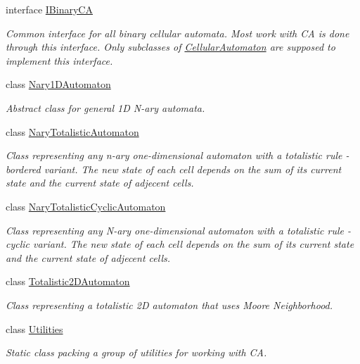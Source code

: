 \begin{DoxyCompactItemize}
interface \hyperlink{interface_cellular_1_1_i_binary_c_a}{I\+Binary\+C\+A}
\begin{DoxyCompactList}\small\item\em Common interface for all binary cellular automata. Most work with C\+A is done through this interface. Only subclasses of {\ttfamily \hyperlink{class_cellular_1_1_cellular_automaton}{Cellular\+Automaton}} are supposed to implement this interface. \end{DoxyCompactList}\item 
class \hyperlink{class_cellular_1_1_nary1_d_automaton}{Nary1\+D\+Automaton}
\begin{DoxyCompactList}\small\item\em Abstract class for general 1\+D N-\/ary automata. \end{DoxyCompactList}\item 
class \hyperlink{class_cellular_1_1_nary_totalistic_automaton}{Nary\+Totalistic\+Automaton}
\begin{DoxyCompactList}\small\item\em Class representing any n-\/ary one-\/dimensional automaton with a totalistic rule -\/ bordered variant. The new state of each cell depends on the sum of its current state and the current state of adjecent cells. \end{DoxyCompactList}\item 
class \hyperlink{class_cellular_1_1_nary_totalistic_cyclic_automaton}{Nary\+Totalistic\+Cyclic\+Automaton}
\begin{DoxyCompactList}\small\item\em Class representing any N-\/ary one-\/dimensional automaton with a totalistic rule -\/ cyclic variant. The new state of each cell depends on the sum of its current state and the current state of adjecent cells. \end{DoxyCompactList}\item 
class \hyperlink{class_cellular_1_1_totalistic2_d_automaton}{Totalistic2\+D\+Automaton}
\begin{DoxyCompactList}\small\item\em Class representing a totalistic 2\+D automaton that uses Moore Neighborhood. \end{DoxyCompactList}\item 
class \hyperlink{class_cellular_1_1_utilities}{Utilities}
\begin{DoxyCompactList}\small\item\em Static class packing a group of utilities for working with C\+A. \end{DoxyCompactList}\end{DoxyCompactItemize}

